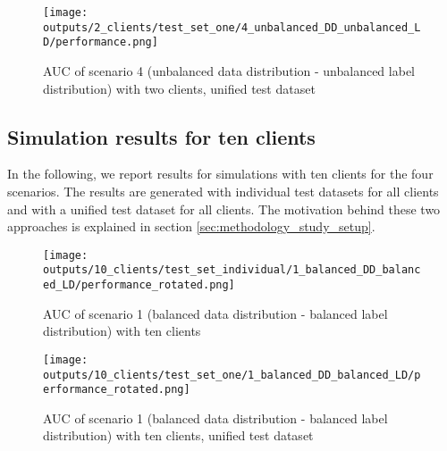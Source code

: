 

\begin{figure}[htb!]
    \centering
    \texttt{[image: outputs/2\_clients/test\_set\_one/4\_unbalanced\_DD\_unbalanced\_LD/performance.png]}
    \caption{AUC of scenario 4 (unbalanced data distribution - unbalanced label distribution) with two clients, unified test dataset}
    \label{fig:auc_box_2_clients_scenario_4_uni}
\end{figure}


\clearpage
\subsection{Simulation results for ten clients\label{sec:10_clients}}
In the following, we report results for simulations with ten clients for the four scenarios. The results are generated with individual test datasets for all clients and with a unified test dataset for all clients. The motivation behind these two approaches is explained in section \ref{sec:methodology_study_setup}.

\begin{figure}[htb!]
    \centering
    \texttt{[image: outputs/10\_clients/test\_set\_individual/1\_balanced\_DD\_balanced\_LD/performance\_rotated.png]}
    \caption{AUC of scenario 1 (balanced data distribution - balanced label distribution) with ten clients}
    \label{fig:auc_box_10_clients_scenario_1}
\end{figure}



\begin{figure}[htb!]
    \centering
    \texttt{[image: outputs/10\_clients/test\_set\_one/1\_balanced\_DD\_balanced\_LD/performance\_rotated.png]}
    \caption{AUC of scenario 1 (balanced data distribution - balanced label distribution) with ten clients, unified test dataset}
    \label{fig:auc_box_10_clients_scenario_1_uni}
\end{figure}

